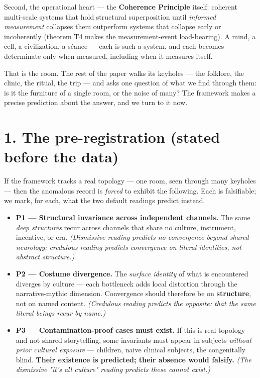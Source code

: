 \documentclass[11pt]{article}
\begin{document}
Second, the operational heart --- the \textbf{Coherence Principle} itself: coherent multi-scale systems that hold structural superposition until \emph{informed measurement} collapses them outperform systems that collapse early or incoherently (theorem T4 makes the measurement-event load-bearing). A mind, a cell, a civilization, a séance --- each is such a system, and each becomes determinate only when measured, including when it measures itself.

That is the room. The rest of the paper walks its keyholes --- the folklore, the clinic, the ritual, the trip --- and asks one question of what we find through them: is it the furniture of a single room, or the noise of many? The framework makes a precise prediction about the answer, and we turn to it now.

\section*{1. The pre-registration (stated before the data)}
If the framework tracks a real topology --- one room, seen through many keyholes --- then the anomalous record is \emph{forced} to exhibit the following. Each is falsifiable; we mark, for each, what the two default readings predict instead.

\begin{itemize}
\item \textbf{P1 --- Structural invariance across independent channels.} The same \emph{deep structures} recur across channels that share no culture, instrument, incentive, or era. \emph{(Dismissive reading predicts no convergence beyond shared neurology; credulous reading predicts convergence on literal identities, not abstract structure.)}
\end{itemize}

\begin{itemize}
\item \textbf{P2 --- Costume divergence.} The \emph{surface identity} of what is encountered diverges by culture --- each bottleneck adds local distortion through the narrative-mythic dimension. Convergence should therefore be on \textbf{structure}, not on named content. \emph{(Credulous reading predicts the opposite: that the same literal beings recur by name.)}
\end{itemize}

\begin{itemize}
\item \textbf{P3 --- Contamination-proof cases must exist.} If this is real topology and not shared storytelling, some invariants must appear in subjects \emph{without prior cultural exposure} --- children, naive clinical subjects, the congenitally blind. \textbf{Their existence is predicted; their absence would falsify.} \emph{(The dismissive "it's all culture" reading predicts these cannot exist.)}
\end{itemize}
\end{document}
